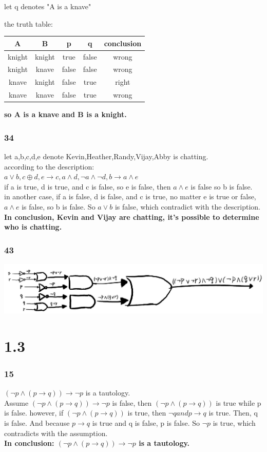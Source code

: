 \documentclass[UTF8]{ctexart}
\begin{document}
let q denotes "A is a knave"

the truth table:

\begin{tabular}{|c|c|c|c|c|}
    \hline
    A & B & p & q & conclusion\\
    \hline
    knight & knight & true & false & wrong\\
    \hline
    knight & knave & false & false & wrong\\
    \hline
    knave & knight & false & true & right\\
    \hline
    knave & knave & false & true & wrong\\
    \hline
\end{tabular}

\textbf{so A is a knave and B is a knight.}
\section{34}
let a,b,c,d,e denote Kevin,Heather,Randy,Vijay,Abby is chatting.\\
according to the description:\\
$a\vee b,c \oplus d,e \to c,a \wedge d,\neg a \wedge \neg d,b\to a \wedge e$\\
if a is true, d is true, and c is false, so e is false, then $a \wedge e$ is false so b is false.\\
in another case, if a is false, d is false, and c is true, no matter e is true or false, $a \wedge e$ is false, so b is false. So $a \vee b$ is false, which contradict with the description. \\
\textbf{In conclusion, Kevin and Vijay are chatting, it's possible to determine who is chatting.}
\section{43}
\includegraphics[scale=0.7]{homework1a}
\part{1.3}
\section{15}
$(\neg p \wedge (p \rightarrow q))\rightarrow \neg p$ is a tautology.\\
Assume $(\neg p \wedge (p \rightarrow q))\rightarrow \neg p$ is false, then $(\neg p \wedge (p \rightarrow q))$ is true while p is false.
however, if $(\neg p \wedge (p \rightarrow q))$ is true, then $\neg q and p \rightarrow q$ is true. Then, q is false. And because $p \rightarrow q$ is true and q is false, p is false. So $\neg p$ is true, which contradicts with the assumption.\\
\textbf{In conclusion: $(\neg p \wedge (p \rightarrow q))\rightarrow \neg p$ is a tautology.}
\end{document}
